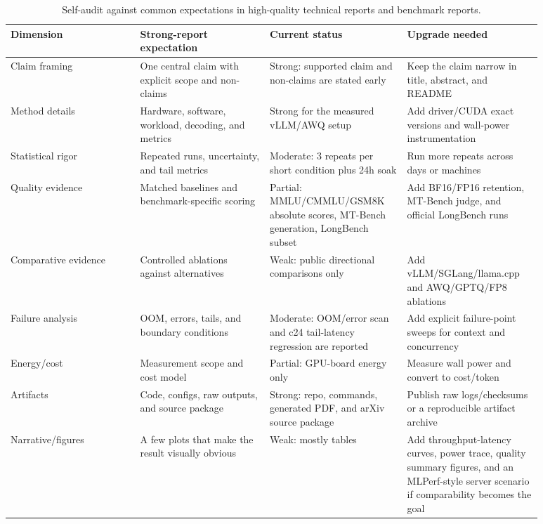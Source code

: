 \documentclass[11pt]{article}
\begin{document}
\begin{table}[h]
\centering
\scriptsize
\setlength{\tabcolsep}{3pt}
\begin{tabular}{>{\raggedright\arraybackslash}p{0.22\linewidth}
                >{\raggedright\arraybackslash}p{0.22\linewidth}
                >{\raggedright\arraybackslash}p{0.22\linewidth}
                >{\raggedright\arraybackslash}p{0.22\linewidth}}
\toprule
Dimension & Strong-report expectation & Current status & Upgrade needed \\
\midrule
Claim framing & One central claim with explicit scope and non-claims &
Strong: supported claim and non-claims are stated early &
Keep the claim narrow in title, abstract, and README \\
Method details & Hardware, software, workload, decoding, and metrics &
Strong for the measured vLLM/AWQ setup &
Add driver/CUDA exact versions and wall-power instrumentation \\
Statistical rigor & Repeated runs, uncertainty, and tail metrics &
Moderate: 3 repeats per short condition plus 24h soak &
Run more repeats across days or machines \\
Quality evidence & Matched baselines and benchmark-specific scoring &
Partial: MMLU/CMMLU/GSM8K absolute scores, MT-Bench generation, LongBench subset &
Add BF16/FP16 retention, MT-Bench judge, and official LongBench runs \\
Comparative evidence & Controlled ablations against alternatives &
Weak: public directional comparisons only &
Add vLLM/SGLang/llama.cpp and AWQ/GPTQ/FP8 ablations \\
Failure analysis & OOM, errors, tails, and boundary conditions &
Moderate: OOM/error scan and c24 tail-latency regression are reported &
Add explicit failure-point sweeps for context and concurrency \\
Energy/cost & Measurement scope and cost model &
Partial: GPU-board energy only &
Measure wall power and convert to cost/token \\
Artifacts & Code, configs, raw outputs, and source package &
Strong: repo, commands, generated PDF, and arXiv source package &
Publish raw logs/checksums or a reproducible artifact archive \\
Narrative/figures & A few plots that make the result visually obvious &
Weak: mostly tables &
Add throughput-latency curves, power trace, quality summary figures, and an
MLPerf-style server scenario if comparability becomes the goal \\
\bottomrule
\end{tabular}
\caption{Self-audit against common expectations in high-quality technical
reports and benchmark reports.}
\label{tab:reporting_checklist}
\end{table}
\end{document}

